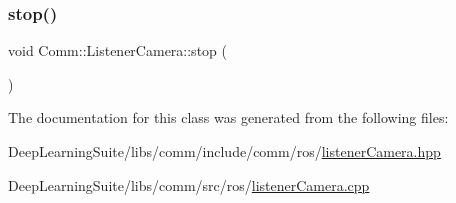 \mbox{\label{class_comm_1_1_listener_camera_a62683e72d06ba387aa19e4f213d1eada}} 
\subsubsection{\texorpdfstring{stop()}{stop()}}
{\footnotesize\ttfamily void Comm\+::\+Listener\+Camera\+::stop (\begin{DoxyParamCaption}{ }\end{DoxyParamCaption})}



The documentation for this class was generated from the following files\+:\begin{DoxyCompactItemize}
\item 
Deep\+Learning\+Suite/libs/comm/include/comm/ros/\hyperlink{listener_camera_8hpp}{listener\+Camera.\+hpp}\item 
Deep\+Learning\+Suite/libs/comm/src/ros/\hyperlink{listener_camera_8cpp}{listener\+Camera.\+cpp}\end{DoxyCompactItemize}

